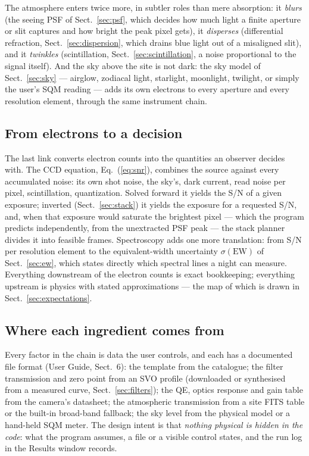 The atmosphere enters twice more, in subtler roles than mere absorption:
it \emph{blurs} (the seeing PSF of Sect.~\ref{sec:psf}, which decides how
much light a finite aperture or slit captures and how bright the peak
pixel gets), it \emph{disperses} (differential refraction,
Sect.~\ref{sec:dispersion}, which drains blue light out of a misaligned
slit), and it \emph{twinkles} (scintillation,
Sect.~\ref{sec:scintillation}, a noise proportional to the signal
itself). And the sky above the site is not dark: the sky model of
Sect.~\ref{sec:sky} --- airglow, zodiacal light, starlight, moonlight,
twilight, or simply the user's SQM reading --- adds its own electrons to
every aperture and every resolution element, through the same instrument
chain.

\subsection{From electrons to a decision}

The last link converts electron counts into the quantities an observer
decides with. The CCD equation, Eq.~(\ref{eq:snr}), combines the source
against every accumulated noise: its own shot noise, the sky's, dark
current, read noise per pixel, scintillation, quantization. Solved
forward it yields the S/N of a given exposure; inverted
(Sect.~\ref{sec:stack}) it yields the exposure for a requested S/N, and,
when that exposure would saturate the brightest pixel --- which the
program predicts independently, from the unextracted PSF peak --- the
stack planner divides it into feasible frames. Spectroscopy adds one
more translation: from S/N per resolution element to the
equivalent-width uncertainty $\sigma(\mathrm{EW})$ of
Sect.~\ref{sec:ew}, which states directly which spectral lines a night
can measure. Everything downstream of the electron counts is exact
bookkeeping; everything upstream is physics with stated approximations
--- the map of which is drawn in Sect.~\ref{sec:expectations}.

\subsection{Where each ingredient comes from}

Every factor in the chain is data the user controls, and each has a
documented file format (User Guide, Sect.~6): the template from the
catalogue; the filter transmission and zero point from an SVO profile
(downloaded or synthesised from a measured curve,
Sect.~\ref{sec:filters}); the QE, optics response and gain table from
the camera's datasheet; the atmospheric transmission from a site FITS
table or the built-in broad-band fallback; the sky level from the
physical model or a hand-held SQM meter. The design intent is that
\emph{nothing physical is hidden in the code}: what the program assumes,
a file or a visible control states, and the run log in the Results
window records.

